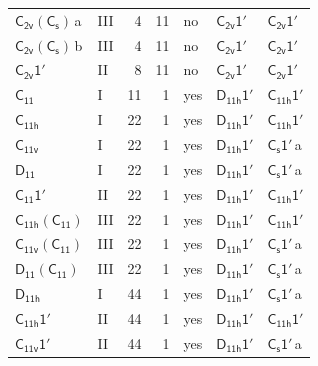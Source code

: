 \documentclass[10pt,a4paper]{article}
\numberwithin{equation}{section}
\newcommand{\grp}[1]{\mathsf{#1}}
\newcommand{\clsletter}[1]{\,{\scriptsize\color{black!55}#1}}
\begin{document}
{\begin{longtable}{@{}llrrlll@{}}
\href{C2v-C1v.pdf}{$\grp{C_{2v}}(\grp{C_{s}})$}\clsletter{a} & III & 4 & 11 & no & \href{C2v-1p.pdf}{$\grp{C_{2v}1'}$} & \href{C2v-1p.pdf}{$\grp{C_{2v}1'}$}\\
\href{C2v-C1v.pdf}{$\grp{C_{2v}}(\grp{C_{s}})$}\clsletter{b} & III & 4 & 11 & no & \href{C2v-1p.pdf}{$\grp{C_{2v}1'}$} & \href{C2v-1p.pdf}{$\grp{C_{2v}1'}$}\\
\href{C2v-1p.pdf}{$\grp{C_{2v}1'}$} & II & 8 & 11 & no & \href{C2v-1p.pdf}{$\grp{C_{2v}1'}$} & \href{C2v-1p.pdf}{$\grp{C_{2v}1'}$}\\
\href{../../../rotation/data/pdf/C11.pdf}{$\grp{C_{11}}$} & I & 11 & 1 & yes & \href{D11h-1p.pdf}{$\grp{D_{11h}1'}$} & \href{C11h-1p.pdf}{$\grp{C_{11h}1'}$}\\
\href{../../../rotation/data/pdf/C11h.pdf}{$\grp{C_{11h}}$} & I & 22 & 1 & yes & \href{D11h-1p.pdf}{$\grp{D_{11h}1'}$} & \href{C11h-1p.pdf}{$\grp{C_{11h}1'}$}\\
\href{../../../rotation/data/pdf/C11v.pdf}{$\grp{C_{11v}}$} & I & 22 & 1 & yes & \href{D11h-1p.pdf}{$\grp{D_{11h}1'}$} & \href{C1v-1p.pdf}{$\grp{C_{s}1'}$}\clsletter{a}\\
\href{../../../rotation/data/pdf/D11.pdf}{$\grp{D_{11}}$} & I & 22 & 1 & yes & \href{D11h-1p.pdf}{$\grp{D_{11h}1'}$} & \href{C1v-1p.pdf}{$\grp{C_{s}1'}$}\clsletter{a}\\
\href{C11-1p.pdf}{$\grp{C_{11}1'}$} & II & 22 & 1 & yes & \href{D11h-1p.pdf}{$\grp{D_{11h}1'}$} & \href{C11h-1p.pdf}{$\grp{C_{11h}1'}$}\\
\href{C11h-C11.pdf}{$\grp{C_{11h}}(\grp{C_{11}})$} & III & 22 & 1 & yes & \href{D11h-1p.pdf}{$\grp{D_{11h}1'}$} & \href{C11h-1p.pdf}{$\grp{C_{11h}1'}$}\\
\href{C11v-C11.pdf}{$\grp{C_{11v}}(\grp{C_{11}})$} & III & 22 & 1 & yes & \href{D11h-1p.pdf}{$\grp{D_{11h}1'}$} & \href{C1v-1p.pdf}{$\grp{C_{s}1'}$}\clsletter{a}\\
\href{D11-C11.pdf}{$\grp{D_{11}}(\grp{C_{11}})$} & III & 22 & 1 & yes & \href{D11h-1p.pdf}{$\grp{D_{11h}1'}$} & \href{C1v-1p.pdf}{$\grp{C_{s}1'}$}\clsletter{a}\\
\href{../../../rotation/data/pdf/D11h.pdf}{$\grp{D_{11h}}$} & I & 44 & 1 & yes & \href{D11h-1p.pdf}{$\grp{D_{11h}1'}$} & \href{C1v-1p.pdf}{$\grp{C_{s}1'}$}\clsletter{a}\\
\href{C11h-1p.pdf}{$\grp{C_{11h}1'}$} & II & 44 & 1 & yes & \href{D11h-1p.pdf}{$\grp{D_{11h}1'}$} & \href{C11h-1p.pdf}{$\grp{C_{11h}1'}$}\\
\href{C11v-1p.pdf}{$\grp{C_{11v}1'}$} & II & 44 & 1 & yes & \href{D11h-1p.pdf}{$\grp{D_{11h}1'}$} & \href{C1v-1p.pdf}{$\grp{C_{s}1'}$}\clsletter{a}\\

\end{longtable}}
\end{document}
